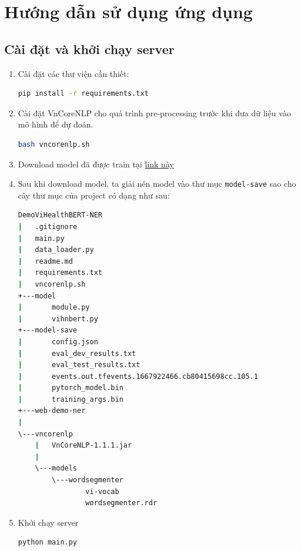 \section{Hướng dẫn sử dụng ứng dụng}
\subsection{Cài đặt và khởi chạy server}
\begin{enumerate}
\item Cài đặt các thư viện cần thiết:
\lstset{style=mystyle}
\begin{lstlisting}[language=bash]
pip install -r requirements.txt
\end{lstlisting}

\item Cài đặt VnCoreNLP cho quá trình pre-processing trước khi đưa dữ liệu vào mô hình để dự đoán.

\lstset{style=mystyle}
\begin{lstlisting}[language=bash]
bash vncorenlp.sh
\end{lstlisting}

\item Download model đã được train tại  \href{https://drive.google.com/drive/u/2/folders/19AGLo-27EeuXDkKG2JstuCgrcwB0854r}{link này}

\item Sau khi download model, ta giải nén model vào thư mục \texttt{model-save} sao cho cây thư mục của project có dạng như sau:
\lstset{style=mystyle}
\begin{lstlisting}[language=bash]
DemoViHealthBERT-NER
|   .gitignore
|   main.py
|   data_loader.py
|   readme.md
|   requirements.txt
|   vncorenlp.sh
+---model
|       module.py
|       vihnbert.py
+---model-save
|       config.json
|       eval_dev_results.txt
|       eval_test_results.txt
|       events.out.tfevents.1667922466.cb80415698cc.105.1
|       pytorch_model.bin
|       training_args.bin
+---web-demo-ner
|
\---vncorenlp
    |   VnCoreNLP-1.1.1.jar
    |
    \---models
        \---wordsegmenter
                vi-vocab
                wordsegmenter.rdr
\end{lstlisting}

\item Khởi chạy server
\lstset{style=mystyle}
\begin{lstlisting}[language=bash]
python main.py 
\end{lstlisting}
\end{enumerate}
